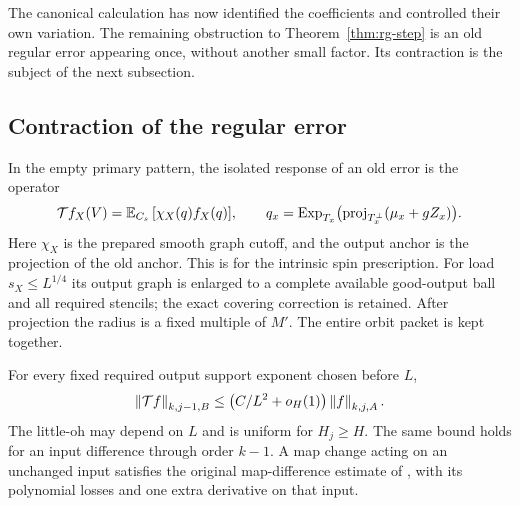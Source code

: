 The canonical calculation has now identified the coefficients and
controlled their own variation.  The remaining obstruction to
Theorem~\ref{thm:rg-step} is an old regular error appearing once,
without another small factor.  Its contraction is the subject of the
next subsection.

\subsection{Contraction of the regular error}
\label{subsec:rg-error}

In the empty primary pattern, the isolated response of an old error
is the operator
\[
 \mathcal T f_X(V)=\mathbb E_{C_s}\,[\chi_X(q)f_X(q)],\qquad
 q_x=\operatorname{Exp}_{T_x}
                \bigl(\operatorname{proj}_{T_x^\perp}(\mu_x+gZ_x)\bigr).
\]
Here $\chi_X$ is the prepared smooth graph cutoff, and the output
anchor is the projection of the old anchor.  This is
 for the intrinsic spin prescription.  For
load $s_X\le L^{1/4}$ its output graph is enlarged to a complete
available good-output ball and all required stencils; the exact
covering correction is retained.  After projection the radius is a
fixed multiple of $M'$.  The entire orbit packet is kept together.

\begin{lemma}
\label{lem:rg-error-contraction}
For every fixed required output support exponent chosen before $L$,
\begin{equation}
 \left\lVert\mathcal Tf\right\rVert_{k,j-1,B}
   \le\bigl(C/L^2+o_H(1)\bigr)\left\lVert f\right\rVert_{k,j,A}.
 \label{eq:orig-9}
\end{equation}
The little-oh may depend on $L$ and is uniform for $H_j\ge H$.
The same bound holds for an input difference through order $k-1$.
A map change acting on an unchanged input satisfies the original
map-difference estimate of , with its
polynomial losses and one extra derivative on that input.
\end{lemma}

